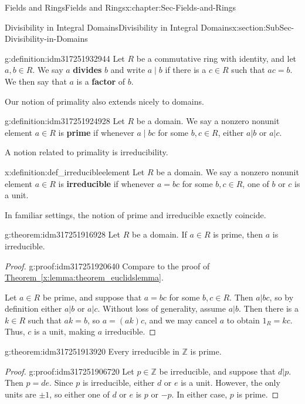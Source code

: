 \documentclass[oneside,10pt,]{book}
\newcommand{\xreffont}{\relax}
\newcommand{\terminology}[1]{\textbf{#1}}
\numberwithin{equation}{section}
\def\Z{{\mathbb Z}}
\begin{document}
\begin{chapterptx}{Fields and Rings}{}{Fields and Rings}{}{}{x:chapter:Sec-Fields-and-Rings}
\begin{sectionptx}{Divisibility in Integral Domains}{}{Divisibility in Integral Domains}{}{}{x:section:SubSec-Divisibility-in-Domains}
\begin{definition}{}{g:definition:idm317251932944}%
Let \(R\) be a commutative ring with identity, and let \(a,b\in R\). We say \(a\) \terminology{divides} \(b\) and write \(a\mid b\) if there is a \(c\in R\) such that \(ac = b\). We then say that \(a\) is a \terminology{factor} of \(b\).%
\end{definition}
Our notion of primality also extends nicely to domains.%
\begin{definition}{}{g:definition:idm317251924928}%
Let \(R\) be a domain. We say a nonzero nonunit element \(a\in R\) is \terminology{prime} if whenever \(a\mid bc\) for some \(b,c\in R\), either \(a|b\) or \(a|c\).%
\end{definition}
A notion related to primality is irreducibility.%
\begin{definition}{}{x:definition:def_irreducibleelement}%
Let \(R\) be a domain. We say a nonzero nonunit element \(a\in R\) is \terminology{irreducible} if whenever \(a = bc\) for some \(b,c\in R\), one of \(b\) or \(c\) is a unit.%
\end{definition}
In familiar settings, the notion of prime and irreducible exactly coincide.%
\begin{theorem}{}{}{g:theorem:idm317251916928}%
Let \(R\) be a domain. If \(a\in R\) is prime, then \(a\) is irreducible.%
\end{theorem}
\begin{proof}{}{g:proof:idm317251920640}
Compare to the proof of \hyperref[x:lemma:theorem_euclidslemma]{Theorem~{\xreffont\ref{x:lemma:theorem_euclidslemma}}}.%
\par
Let \(a\in R\) be prime, and suppose that \(a = bc\) for some \(b,c\in R\). Then \(a|bc\), so by definition either \(a|b\) or \(a|c\). Without loss of generality, assume \(a|b\). Then there is a \(k\in R\) such that \(ak=b\), so \(a = (ak)c\), and we may cancel \(a\) to obtain \(1_R = kc\). Thus, \(c\) is a unit, making \(a\) irreducible.%
\end{proof}
\begin{theorem}{}{}{g:theorem:idm317251913920}%
Every irreducible in \(\Z\) is prime.%
\end{theorem}
\begin{proof}{}{g:proof:idm317251906720}
Let \(p\in \Z\) be irreducible, and suppose that \(d|p\). Then \(p = de\). Since \(p\) is irreducible, either \(d\) or \(e\) is a unit. However, the only units are \(\pm 1\), so either one of \(d\) or \(e\) is \(p\) or \(-p\). In either case, \(p\) is prime.%
\end{proof}

\end{sectionptx}
\end{chapterptx}
\end{document}
